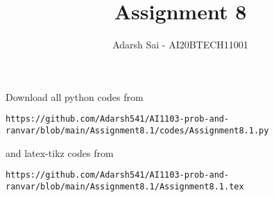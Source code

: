 \documentclass[journal,12pt,twocolumn]{IEEEtran}
\DeclareMathOperator*{\Res}{Res}
\begin{document}
\newcommand{\BEQA}{\begin{eqnarray}}
\newcommand{\EEQA}{\end{eqnarray}}
\newcommand{\define}{\stackrel{\triangle}{=}}

\raggedbottom
\setlength{\parindent}{0pt}
\providecommand{\mbf}{\mathbf}
\providecommand{\pr}[1]{\ensuremath{\Pr\left(#1\right)}}
\providecommand{\qfunc}[1]{\ensuremath{Q\left(#1\right)}}
\providecommand{\sbrak}[1]{\ensuremath{{}\left[#1\right]}}
\providecommand{\lsbrak}[1]{\ensuremath{{}\left[#1\right.}}
\providecommand{\rsbrak}[1]{\ensuremath{{}\left.#1\right]}}
\providecommand{\brak}[1]{\ensuremath{\left(#1\right)}}
\providecommand{\lbrak}[1]{\ensuremath{\left(#1\right.}}
\providecommand{\rbrak}[1]{\ensuremath{\left.#1\right)}}
\providecommand{\cbrak}[1]{\ensuremath{\left\{#1\right\}}}
\providecommand{\lcbrak}[1]{\ensuremath{\left\{#1\right.}}
\providecommand{\rcbrak}[1]{\ensuremath{\left.#1\right\}}}
\theoremstyle{remark}
\newtheorem{rem}{Remark}
\newcommand{\sgn}{\mathop{\mathrm{sgn}}}
\providecommand{\abs}[1]{\vert#1\vert}
\providecommand{\res}[1]{\Res\displaylimits_{#1}} 
\providecommand{\norm}[1]{\lVert#1\rVert}
\providecommand{\mtx}[1]{\mathbf{#1}}
\providecommand{\mean}[1]{E[ #1 ]}
\providecommand{\fourier}{\overset{\mathcal{F}}{ \rightleftharpoons}}
\providecommand{\system}{\overset{\mathcal{H}}{ \longleftrightarrow}}
\newcommand{\solution}{\noindent \textbf{Solution: }}
\newcommand{\cosec}{\,\text{cosec}\,}
\providecommand{\dec}[2]{\ensuremath{\overset{#1}{\underset{#2}{\gtrless}}}}
\newcommand{\myvec}[1]{\ensuremath{\begin{pmatrix}#1\end{pmatrix}}}
\newcommand{\mydet}[1]{\ensuremath{\begin{vmatrix}#1\end{vmatrix}}}
\makeatletter
{}
\makeatother
\let\StandardTheFigure\thefigure
\let\vec\mathbf
\renewcommand{\thefigure}{\theproblem}
\def\putbox#1#2#3{\makebox[0in][l]{\makebox[#1][l]{}\raisebox{\baselineskip}[0in][0in]{\raisebox{#2}[0in][0in]{#3}}}}
     \def\rightbox#1{\makebox[0in][r]{#1}}
     \def\centbox#1{\makebox[0in]{#1}}
     \def\topbox#1{\raisebox{-\baselineskip}[0in][0in]{#1}}
     \def\midbox#1{\raisebox{-0.5\baselineskip}[0in][0in]{#1}}
\vspace{3cm}
\title{Assignment 8}
\author{Adarsh Sai - AI20BTECH11001}
\maketitle
\newpage
\bigskip
\renewcommand{\thefigure}{\theenumi}
\renewcommand{\thetable}{\theenumi}
Download all python codes from 
\begin{lstlisting}
https://github.com/Adarsh541/AI1103-prob-and-ranvar/blob/main/Assignment8.1/codes/Assignment8.1.py
\end{lstlisting}
%
and latex-tikz codes from 
%
\begin{lstlisting}
https://github.com/Adarsh541/AI1103-prob-and-ranvar/blob/main/Assignment8.1/Assignment8.1.tex
\end{lstlisting}
\end{document}
